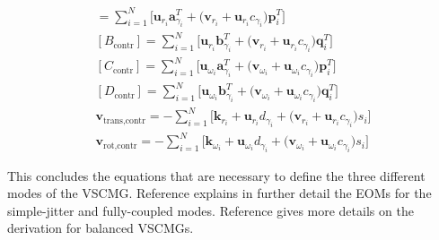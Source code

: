 \begin{gather}
[A_\text{contr}] =  \sum\limits_{i=1}^{N}\Big[\bm{u}_{r_i}\bm{a}_{\gamma_i}^T + \big(\bm{v}_{r_i} + \bm{u}_{r_i}c_{\gamma_i}\big)\bm{p}_i^T\Big]
\\
[B_\text{contr}] =  \sum\limits_{i=1}^{N}\Big[\bm{u}_{r_i}\bm{b}_{\gamma_i}^T + \big(\bm{v}_{r_i} + \bm{u}_{r_i}c_{\gamma_i}\big)\bm{q}_i^T\Big]
\\
[C_\text{contr}] = \sum\limits_{i=1}^{N}\Big[\bm{u}_{\omega_i}\bm{a}_{\gamma_i}^T + \big(\bm{v}_{\omega_i} + \bm{u}_{\omega_i}c_{\gamma_i}\big)\bm{p}_i^T\Big]
\\
[D_\text{contr}] = \sum\limits_{i=1}^{N}\Big[\bm{u}_{\omega_i}\bm{b}_{\gamma_i}^T + \big(\bm{v}_{\omega_i} + \bm{u}_{\omega_i}c_{\gamma_i}\big)\bm{q}_i^T\Big]
\\
\bm{v}_\text{trans,contr} =  -  \sum\limits_{i=1}^{N}\Big[\bm{k}_{r_i}+\bm{u}_{r_i}d_{\gamma_i} + \big(\bm{v}_{r_i} + \bm{u}_{r_i}c_{\gamma_i}\big)s_i\Big]
\\
\bm{v}_\text{rot,contr} = -  \sum\limits_{i=1}^{N}\Big[\bm{k}_{\omega_i} +\bm{u}_{\omega_i}d_{\gamma_i}+ \big(\bm{v}_{\omega_i} + \bm{u}_{\omega_i}c_{\gamma_i}\big)s_i\Big]
\end{gather}

This concludes the equations that are necessary to define the three different modes of the VSCMG. Reference\cite{Alcorn:2016yq} explains in further detail the EOMs for the simple-jitter and fully-coupled modes. Reference\cite{schaub} gives more details on the derivation for balanced VSCMGs.


